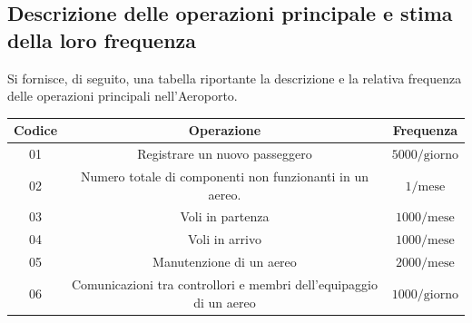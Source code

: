 \subsection{Descrizione delle operazioni principale e stima della loro frequenza}

\textsf{\small Si fornisce, di seguito, una tabella riportante la descrizione e la relativa frequenza delle operazioni principali nell'Aeroporto.}\\

\begin{tabular}{ | c c c |} 
	\hline
	\rowcolor{airforceblue}
	\textbf{\color{white}Codice} & \textbf{\color{white}Operazione} & \textbf{\color{white}Frequenza} \\
	\hline
	\textsf{\small 01} & \textsf{\small Registrare un nuovo passeggero} & \textsf{\small $5000/\text{giorno}$} \\ %
	\hline
	\textsf{\small 02} & \textsf{\small  Numero totale di componenti non funzionanti in un aereo.} & \textsf{\small $ 1/\text{mese} $} \\ 
	\hline
	\textsf{\small 03} & \textsf{\small Voli in partenza} & \textsf{\small $ 1000 / \text{mese} $} \\
	\hline
	\textsf{\small 04} & \textsf{\small Voli in arrivo} & \textsf{\small $ 1000 / \text{mese} $} \\
	\hline
	\textsf{\small 05} & \textsf{\small Manutenzione di un aereo} & \textsf{\small $ 2000 / \text{mese} $} \\
	\hline
	\textsf{\small 06} & \textsf{\small Comunicazioni tra controllori e membri dell'equipaggio di un aereo} & \textsf{\small $ 1000 / \text{giorno} $} \\
	

\end{tabular}
